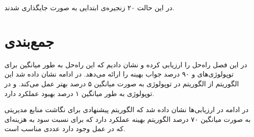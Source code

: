 در این حالت ۲۰ زنجیره‌ی ابتدایی به صورت 
جایگذاری شدند.


\section{جمع‌بندی}
در این فصل راه‌حل  را ارزیابی کرده و نشان دادیم
که این راه‌حل به طور میانگین برای توپولوژی‌های  و 
۹۰ درصد جواب بهینه را ارائه می‌دهد.
در ادامه نشان داده شد این الگوریتم از الگوریتم 
در توپولوژی 
به صورت میانگین ۵ درصد بهتر عمل می‌کند.
و در توپولوژی 
به طور میانگین ۱ درصد بهبود عملکرد دارد.

در ادامه در ارزیابی‌ها نشان داده شد که الگوریتم پیشنهادی برای نگاشت منابع مدیریتی
به صورت میانگین ۷۰ درصد الگوریتم بهینه عملکرد دارد
که برای نسبت سود به هزینه‌ای که در عمل وجود دارد عددی مناسب است.
